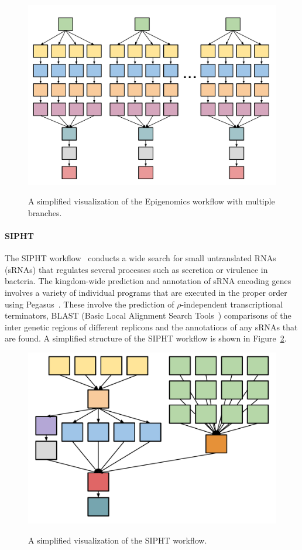 \begin{figure}[htb]
	\centering
	\includegraphics[width=\linewidth]{figures/balance/figure17.pdf} \\
	\caption{A simplified visualization of the Epigenomics workflow with multiple branches.}
	\label{fig:evaluation_shape_genome}
\end{figure}

\paragraph{\textbf{SIPHT}}
The SIPHT workflow~\cite{SIPHT} conducts a wide search for small untranslated RNAs (sRNAs) that regulates several processes such as secretion or virulence in bacteria. The kingdom-wide prediction and annotation of sRNA encoding genes involves a variety of individual programs that are executed in the proper order using Pegasus~\cite{Deelman2004}. These involve the prediction of $\rho$-independent transcriptional terminators, BLAST (Basic Local Alignment Search Tools~\cite{SIPHT}) comparisons of the inter genetic regions of different replicons and the annotations of any sRNAs that are found. A simplified structure of the SIPHT workflow is shown in Figure~\ref{fig:evaluation_shape_sipht}. 

\begin{figure}[htb]
	\centering
	\includegraphics[width=0.7\linewidth]{figures/balance/figure18.pdf} \\
	\caption{A simplified visualization of the SIPHT workflow.}
	\label{fig:evaluation_shape_sipht}
\end{figure}


